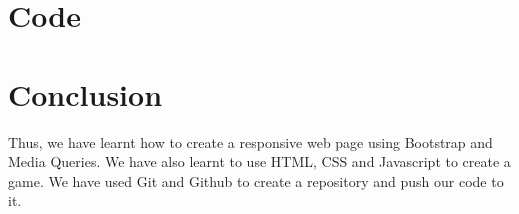 \documentclass[11pt]{article}
\begin{document}
\section{Code}







\section{Conclusion}
Thus, we have learnt how to create a responsive web page using Bootstrap and Media Queries. We have also learnt to use HTML, CSS and Javascript to create a game. We have used Git and Github to create a repository and push our code to it.
\clearpage
\end{document}
